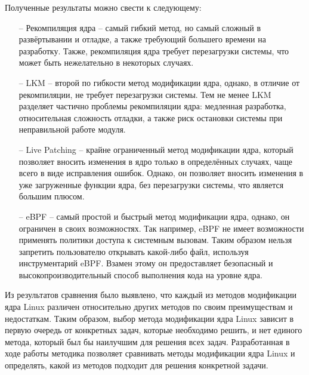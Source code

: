 Полученные результаты можно свести к следующему:
\begin{itemize}
    \item[--] Рекомпиляция ядра -- самый гибкий метод, но самый сложный в развёртывании и отладке, а также требующий большего времени на разработку.
    Также, рекомпиляция ядра требует перезагрузки системы, что может быть нежелательно в некоторых случаях.
    \item[--] LKM -- второй по гибкости метод модификации ядра, однако, в отличие от рекомпиляции, не требует перезагрузки системы.
    Тем не менее LKM разделяет частично проблемы рекомпиляции ядра: медленная разработка, относительная сложность отладки, а также риск остановки системы при неправильной работе модуля.
    \item[--] Live Patching -- крайне ограниченный метод модификации ядра, который позволяет вносить изменения в ядро только в определённых случаях, чаще всего в виде исправления ошибок.
    Однако, он позволяет вносить изменения в уже загруженные функции ядра, без перезагрузки системы, что является большим плюсом.
    \item[--] eBPF -- самый простой и быстрый метод модификации ядра, однако, он ограничен в своих возможностях.
    Так например, eBPF не имеет возможности применять политики доступа к системным вызовам.
    Таким образом нельзя запретить пользователю открывать какой-либо файл, используя инструментарий eBPF\@.
    Взамен этому он предоставляет безопасный и высокопроизводительный способ выполнения кода на уровне ядра.
\end{itemize}

\indent Из результатов сравнения было выявлено, что каждый из методов модификации ядра Linux различен относительно других методов по своим преимуществам и недостаткам.
Таким образом, выбор метода модификации ядра Linux зависит в первую очередь от конкретных задач, которые необходимо решить, и нет единого метода, который был бы наилучшим для решения всех задач.
Разработанная в ходе работы методика позволяет сравнивать методы модификации ядра Linux и определять, какой из методов подходит для решения конкретной задачи.
